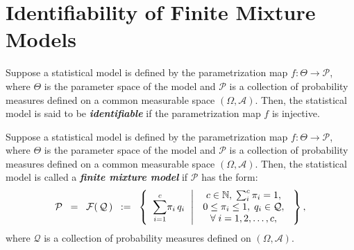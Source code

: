 

\section{Identifiability of Finite Mixture Models}
\setcounter{theorem}{0}
\setcounter{equation}{0}

\renewcommand{\theenumi}{\roman{enumi}}
\renewcommand{\labelenumi}{\textnormal{(\theenumi)}$\;\;$}

\begin{definition}
\mbox{}\vskip 0.05cm
\noindent
Suppose a statistical model is defined by the parametrization map
$f : \Theta \longrightarrow \mathcal{P}$,
where $\Theta$ is the parameter space of the model and
$\mathcal{P}$ is a collection of probability measures
defined on a common measurable space $\left(\Omega,\mathcal{A}\right)$.
Then, the statistical model is said to be \textbf{\emph{identifiable}} if
the parametrization map $f$ is injective.
\end{definition}

\begin{definition}
\mbox{}\vskip 0.05cm
\noindent
Suppose a statistical model is defined by the parametrization map
$f : \Theta \longrightarrow \mathcal{P}$,
where $\Theta$ is the parameter space of the model and
$\mathcal{P}$ is a collection of probability measures
defined on a common measurable space $\left(\Omega,\mathcal{A}\right)$.
Then, the statistical model is called a \textbf{\emph{finite mixture model}} if
$\mathcal{P}$ has the form:
\begin{equation*}
\mathcal{P}
\;\; = \;\;
\mathcal{F}\!\left(\,\mathcal{Q}\,\right)
\;\; := \;\;
\left\{\;\;
	\overset{c}{\underset{i=1}{\sum}}\pi_{i}\,q_{i}
	\,\;\left\vert\,\;
	\begin{array}{c}
		c \in \mathbb{N}, \; \sum_{i}^{c}\pi_{i} = 1, \\
		0 \leq \pi_{i} \leq 1, \; q_{i} \in \mathcal{Q}, \\
		\forall\;i = 1,2,\ldots,c,
	\end{array}
	\right.
\;\right\},
\end{equation*}
where $\mathcal{Q}$ is a collection of probability measures defined on
$\left(\Omega,\mathcal{A}\right)$.
\end{definition}

